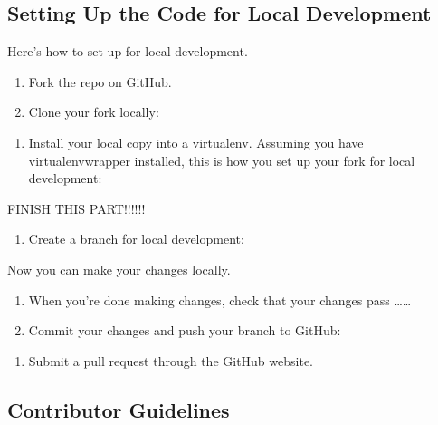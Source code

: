 \documentclass[letterpaper,10pt,english]{sphinxmanual}
\begin{document}
\subsection{Setting Up the Code for Local Development}
\label{\detokenize{MANIFEST:setting-up-the-code-for-local-development}}
Here’s how to set up  for local development.
\begin{enumerate}
%
\item {} 
Fork the  repo on GitHub.

\item {} 
Clone your fork locally:

\end{enumerate}
\begin{enumerate}
%
\setcounter{enumi}{2}
\item {} 
Install your local copy into a virtualenv. Assuming you have virtualenvwrapper installed, this is how you set up your fork for local development:

\end{enumerate}

FINISH THIS PART!!!!!!
\begin{enumerate}
%
\setcounter{enumi}{3}
\item {} 
Create a branch for local development:

\end{enumerate}

Now you can make your changes locally.
\begin{enumerate}
%
\setcounter{enumi}{4}
\item {} 
When you’re done making changes, check that your changes pass ……

\item {} 
Commit your changes and push your branch to GitHub:

\end{enumerate}
\begin{enumerate}
%
\setcounter{enumi}{6}
\item {} 
Submit a pull request through the GitHub website.

\end{enumerate}


\subsection{Contributor Guidelines}
\label{\detokenize{MANIFEST:contributor-guidelines}}
\end{document}
